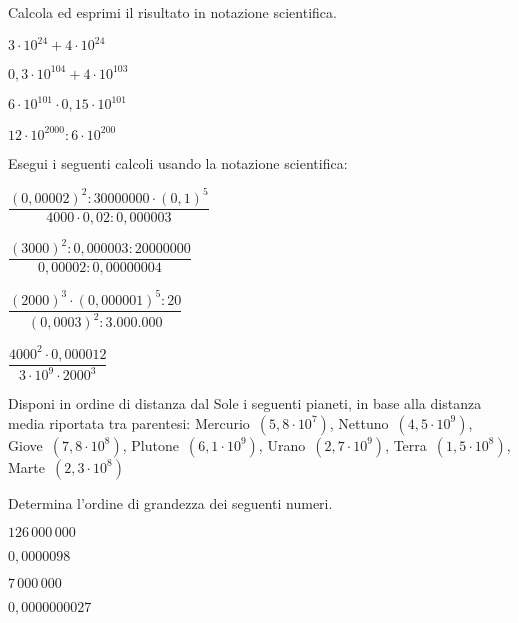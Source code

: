 
\begin{esercizio}
\label{ese:3.66}
Calcola ed esprimi il risultato in notazione scientifica.

\begin{htmulticols}{2}
\begin{enumeratees}
\item \(3\cdot10^{24} +4\cdot10^{24}\)
\item \(0,3\cdot10^{104} +4\cdot10^{103}\)
\item \(6\cdot10^{101}\cdot0,15\cdot10^{101}\)
\item \(12\cdot10^{2000}:6\cdot10^{200}\)
\end{enumeratees}
\end{htmulticols}
\end{esercizio}

\begin{esercizio}[*]
\label{ese:3.67}
Esegui i seguenti calcoli usando la notazione scientifica:

\begin{htmulticols}{2}
\begin{enumeratees}
\item \(\dfrac{(0,00002)^2:30000000\cdot(0,1)^5}{4000 \cdot0,02:0,000003}\)
\item \(\dfrac{(3000)^2:0,000003:20000000}{0,00002:0,00000004}\)
\item \(\dfrac{(2000)^3 \cdot (0,000001)^5:20}{(0,0003)^2:3.000.000}\)
\item \(\dfrac{4000^2\cdot 0,000012}{3\cdot 10^9\cdot 2000^3}\)
\end{enumeratees}
\end{htmulticols}
\end{esercizio}

\begin{esercizio}
\label{ese:3.71}
Disponi in ordine di distanza dal Sole i seguenti pianeti, in base alla 
distanza media riportata
tra parentesi: Mercurio~\((5,8\cdot10^7)\), Nettuno~\((4,5\cdot10^9)\), 
Giove~\((7,8\cdot10^8)\),
Plutone~\((6,1\cdot10^9)\), Urano~\((2,7\cdot10^9)\), 
Terra~\((1,5\cdot10^8)\), 
Marte~\((2,3\cdot10^8)\)
\end{esercizio}


\begin{esercizio}
\label{ese:3.72}
Determina l'ordine di grandezza dei seguenti numeri.

\begin{htmulticols}{4}
\begin{enumeratees}
\item \(126\,000\,000\)
\item \(0,0000098\)
\item \(7\,000\,000\)
\item \(0,0000000027\)
\end{enumeratees}

\end{htmulticols}
\end{esercizio}

